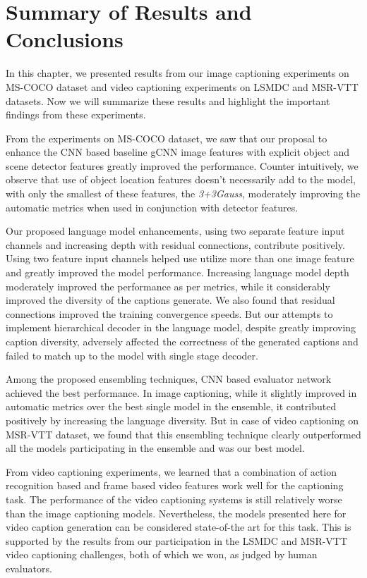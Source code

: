 \section{Summary of Results and Conclusions}
In this chapter, we presented results from our image captioning experiments on
MS-COCO dataset and video captioning experiments on LSMDC and MSR-VTT datasets.
Now we will summarize these results and highlight the important findings from
these experiments.

From the experiments on MS-COCO dataset, we saw that our proposal to enhance the
CNN based baseline gCNN image features with explicit object and scene detector
features greatly improved the performance. 
Counter intuitively, we observe that use of object location features doesn't
necessarily add to the model, with only the smallest of these features, the
\emph{3+3Gauss}, moderately improving the automatic metrics when used in
conjunction with detector features.

Our proposed language model enhancements, using two separate feature input
channels and increasing depth with residual connections, contribute positively.
Using two feature input channels helped use utilize more than one image feature
and greatly improved the model performance.
Increasing language model depth moderately improved the performance as per
metrics, while it considerably improved the diversity of the captions generate.
We also found that residual connections improved the training convergence
speeds.
But our attempts to implement hierarchical decoder in the language model,
despite greatly improving caption diversity, adversely affected the correctness
of the generated captions and failed to match up to the model with single stage
decoder.

Among the proposed ensembling techniques, CNN based evaluator network achieved
the best performance.
In image captioning, while it slightly improved in automatic metrics over the
best single model in the ensemble, it contributed positively by increasing the
language diversity. 
But in case of video captioning on MSR-VTT dataset, we found that this ensembling
technique clearly outperformed all the models participating in the ensemble and
was our best model.

From video captioning experiments, we learned that a combination of action
recognition based and frame based video features work well for the captioning
task.
The performance of the video captioning systems is still relatively worse than
the image captioning models.
Nevertheless, the models presented here for video caption generation can be
considered state-of-the art for this task.
This is supported by the results from our participation in the LSMDC and MSR-VTT
video captioning challenges, both of which we won, as judged by human
evaluators.

